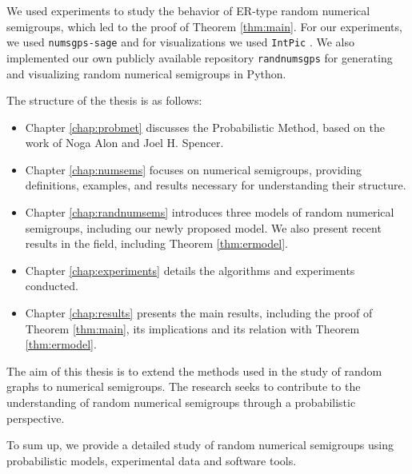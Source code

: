We used experiments to study the behavior of ER-type random numerical semigroups, which led to the proof of Theorem \ref{thm:main}. For our experiments, we used \verb|numsgps-sage| \cite[O'Neill]{oneill2018}\cite[Delgado]{delgado2015numericalsgps} and for visualizations we used \verb|IntPic| \cite[Delgado]{delgado2013intpic}. We also implemented our own publicly available repository \verb|randnumsgps| \cite{morales2023} for generating and visualizing random numerical semigroups in Python.\par

The structure of the thesis is as follows:

\begin{itemize}
    \item Chapter \ref{chap:probmet} discusses the Probabilistic Method, based on the work of Noga Alon and Joel H. Spencer.
    \item Chapter \ref{chap:numsems} focuses on numerical semigroups, providing definitions, examples, and results necessary for understanding their structure.
    \item Chapter \ref{chap:randnumsems} introduces three models of random numerical semigroups, including our newly proposed model. We also present recent results in the field, including Theorem \ref{thm:ermodel}. 
    \item Chapter \ref{chap:experiments} details the algorithms and experiments conducted.
    \item Chapter \ref{chap:results} presents the main results, including the proof of Theorem \ref{thm:main}, its implications and its relation with Theorem \ref{thm:ermodel}.
\end{itemize}

The aim of this thesis is to extend the methods used in the study of random graphs to numerical semigroups. The research seeks to contribute to the understanding of random numerical semigroups through a probabilistic perspective. \par
To sum up, we provide a detailed study of random numerical semigroups using probabilistic models, experimental data and software tools.\par
